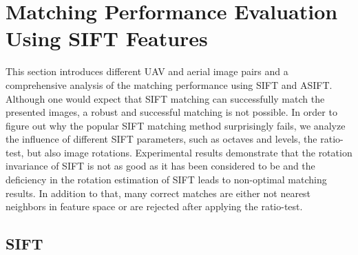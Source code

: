 \section{Matching Performance Evaluation Using SIFT Features}\label{sec:Analysis}
This section introduces different UAV and aerial image pairs and a comprehensive analysis of the matching performance using SIFT and ASIFT. 
Although one would expect that SIFT matching can successfully match the presented images, a robust and successful matching is not possible.
In order to figure out why the popular SIFT matching method surprisingly fails, we analyze the influence of different SIFT parameters, such as octaves and levels, the ratio-test, but also image rotations. 
Experimental results demonstrate that the rotation invariance of SIFT is not as good as it has been considered to be and the deficiency in the rotation estimation of SIFT leads to non-optimal matching results. 
In addition to that, many correct matches are either not nearest neighbors in feature space or are rejected after applying the ratio-test.

\subsection{SIFT}\label{sec:SIFT}


